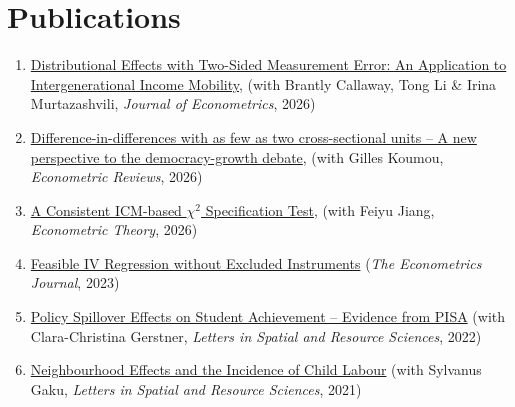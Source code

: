 \documentclass[12pt,letterpaper]{article}
\begin{document}
\section*{Publications}
\begin{enumerate}
  \item \href{https://www.sciencedirect.com/science/article/pii/S0304407626000898}{Distributional Effects with Two-Sided Measurement Error: An Application to Intergenerational Income Mobility}, (with Brantly Callaway, Tong Li \& Irina Murtazashvili, \textit{Journal of Econometrics}, 2026)
  
  \item \href{https://www.tandfonline.com/eprint/GA9C4VHPMCHGYDFRXRTD/full?target=10.1080/07474938.2026.2670372#abstract}{Difference-in-differences with as few as two cross-sectional units -- A new perspective to the democracy-growth debate}, (with Gilles Koumou, \textit{Econometric Reviews}, 2026)

  \item \href{https://www.cambridge.org/core/journals/econometric-theory/article/consistent-icmbased-chi2-specification-test/DF98A874F40AA24D1414C62C4F2357C9}{A Consistent ICM-based $\chi^2$ Specification Test}, (with Feiyu Jiang, \textit{Econometric Theory}, 2026) 
  
  \item \href{https://academic.oup.com/ectj/advance-article-abstract/doi/10.1093/ectj/utac032/6888009?redirectedFrom=fulltext}{Feasible IV Regression without Excluded Instruments} (\textit{The Econometrics Journal}, 2023)
  
  \item \href{https://link.springer.com/article/10.1007/s12076-022-00310-y}{Policy Spillover Effects on Student Achievement – Evidence from PISA} (with Clara-Christina Gerstner, \textit{Letters in Spatial and Resource Sciences}, 2022) 
  
	\item \href{https://link.springer.com/article/10.1007/s12076-021-00276-3}{Neighbourhood Effects and the Incidence of Child Labour} (with Sylvanus Gaku, \textit{Letters in Spatial and Resource Sciences}, 2021)
\end{enumerate}
\end{document}
